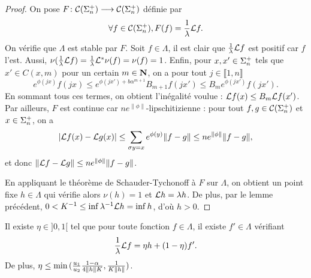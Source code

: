   \begin{proof}
    On pose $F \colon \Csp{n} \longrightarrow \Csp{n}$ définie par
    $$\forall f \in \Csp{n}, F(f) = \frac 1 \lambda \L f.$$
    On vérifie que $\Lambda$ est stable par $F$. Soit $f \in \Lambda$,
    il est clair que $\frac 1 \lambda \L f$ est positif car $f$ l'est. Aussi,
    $\nu(\frac 1 \lambda \L f) = \frac 1 \lambda \L^*\nu(f) = \nu(f) = 1$.
    Enfin, pour $x, x' \in \sp_n$ tels que $x' \in C(x,m)$ pour un certain $m \in \N$, on a pour tout $j \in \llbracket 1, n\rrbracket$
    $$e^{\phi(jx)}f(jx) \leq e^{\phi(jx') + b\alpha^{m+1}}B_{m+1}f(jx') \leq B_me^{\phi(jx')}f(jx').$$
    En sommant tous ces termes, on obtient l'inégalité voulue : $\L f(x) \leq B_m\L f(x')$.
    Par ailleurs, $F$ est continue car $ne^{\lVert\phi\rVert}$-lipschitizienne : pour tout $f,g \in \Csp{n}$ et $x\in\sp_n$, on a
    $$\left|\L f(x) - \L g(x) \right| \leq \sum_{\sigma y = x}{e^{\phi(y)}\lVert f-g\rVert} \leq ne^{\lVert\phi\rVert}\lVert f-g\rVert,$$
    et donc $\lVert\L f - \L g\rVert \leq ne^{\lVert\phi\rVert}\lVert f-g\rVert$.

    En appliquant le théorème de Schauder-Tychonoff à $F$ sur $\Lambda$, on obtient un point fixe $h \in \Lambda$
    qui vérifie alors $\nu(h) = 1$ et $\L h = \lambda h$. De plus, par le lemme précédent,
    $0 < K^{-1} \leq \inf{\lambda^{-1}\L h} = \inf{h}$, d'où $h > 0$.
  \end{proof}


  \begin{lemma}
    \label{lem:Lf_decomp}
    Il existe $\eta \in ]0, 1[$ tel que pour toute fonction $f \in \Lambda$, il existe $f' \in \Lambda$ vérifiant
    $$\frac 1 \lambda \L f = \eta h + (1-\eta)f'.$$
    De plus, $\eta \leq \min{(\frac{u_1}{u_2} \frac{1-\alpha}{4\No{h}K}, \frac 1 {K\lVert h\rVert})}$.
  \end{lemma}

